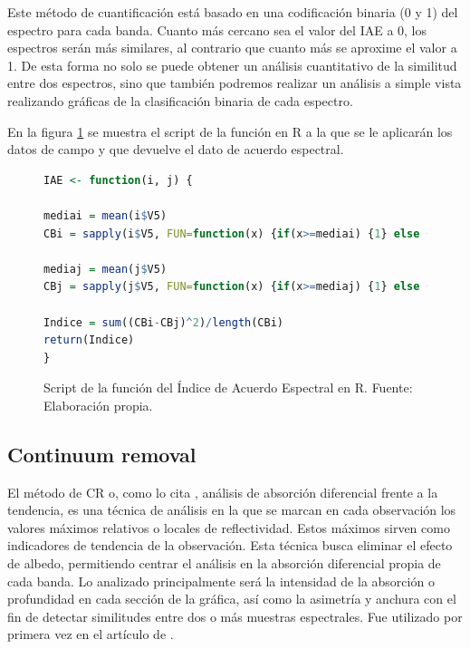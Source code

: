 Este método de cuantificación está basado en una codificación binaria (0 y 1) del espectro para cada banda. Cuanto más cercano sea el valor del \ac{IAE} a 0, los espectros serán más similares, al contrario que cuanto más se aproxime el valor a 1. De esta forma no solo se puede obtener un análisis cuantitativo de la similitud entre dos espectros, sino que también podremos realizar un análisis a simple vista realizando gráficas de la clasificación binaria de cada espectro.\Sep

En la figura \ref{fig:IAE} se muestra el script de la función en R a la que se le aplicarán los datos de campo y que devuelve el dato de acuerdo espectral.

\begin{figure}
\centering
\begin{lstlisting}[language = R, frame = single]
IAE <- function(i, j) {
  
mediai = mean(i$V5)
CBi = sapply(i$V5, FUN=function(x) {if(x>=mediai) {1} else {0}})
  
mediaj = mean(j$V5)
CBj = sapply(j$V5, FUN=function(x) {if(x>=mediaj) {1} else {0}})
  	
Indice = sum((CBi-CBj)^2)/length(CBi)
return(Indice)  
}
\end{lstlisting}
\caption[Función de Índice de Acuerdo Espectral]{Script de la función del Índice de Acuerdo Espectral en R. Fuente: Elaboración propia.}
\label{fig:IAE}
\end{figure}

\subsection{Continuum removal}
\label{subsec:Continuum_removal}

El método de \ac{CR} o, como lo cita \cite{chuvieco2002teledeteccion}, análisis de absorción diferencial frente a la tendencia, es una técnica de análisis en la que se marcan en cada observación los valores máximos relativos o locales de reflectividad. Estos máximos sirven como indicadores de tendencia de la observación. Esta técnica busca eliminar el efecto de albedo, permitiendo centrar el análisis en la absorción diferencial propia de cada banda. Lo analizado principalmente será la intensidad de la absorción o profundidad en cada sección de la gráfica, así como la asimetría y anchura con el fin de detectar similitudes entre dos o más muestras espectrales. Fue utilizado por primera vez en el artículo de \cite{kokaly1999spectroscopic}.\Sep

